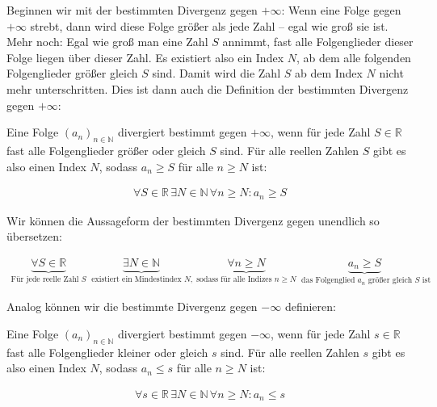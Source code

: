 \documentclass[fontsize=9pt,
               parskip=half-,
               DIV=14,
               listof=chapterentry,
               tocflat]{scrbook}
\begin{document}
Beginnen wir mit der bestimmten Divergenz gegen $+\infty $: Wenn eine Folge gegen $+\infty $ strebt, dann wird diese Folge größer als jede Zahl – egal wie groß sie ist. Mehr noch: Egal wie groß man eine Zahl $S$ annimmt, fast alle Folgenglieder dieser Folge liegen über dieser Zahl. Es existiert also ein Index $N$, ab dem alle folgenden Folgenglieder größer gleich $S$ sind. Damit wird die Zahl $S$ ab dem Index $N$ nicht mehr unterschritten. Dies ist dann auch die Definition der bestimmten Divergenz gegen $+\infty $:

\begin{definition*}
Eine Folge $(a_{n})_{n\in \mathbb {N} }$ divergiert bestimmt gegen $+\infty $, wenn für jede Zahl $S\in \mathbb {R} $ fast alle Folgenglieder größer oder gleich $S$ sind. Für alle reellen Zahlen $S$ gibt es also einen Index $N$, sodass $a_{n}\geq S$ für alle $n\geq N$ ist:

\begin{align*}
\forall S\in \mathbb {R} \,\exists N\in \mathbb {N} \,\forall n\geq N:a_{n}\geq S
\end{align*}

\end{definition*}

Wir können die Aussageform der bestimmten Divergenz gegen unendlich so übersetzen:

\begin{align*}
\underbrace {{\underset {}{}}\forall S\in \mathbb {R} } _{{\text{Für jede reelle Zahl }}S}\ \underbrace {{\underset {}{}}\exists N\in \mathbb {N} } _{{\text{ existiert ein Mindestindex }}N,}\ \underbrace {{\underset {}{}}\forall n\geq N} _{{\text{sodass für alle Indizes }}n\geq N}\ \underbrace {{\underset {}{}}a_{n}\geq S} _{{\text{ das Folgenglied }}a_{n}{\text{ größer gleich }}S{\text{ ist}}}
\end{align*}

Analog können wir die bestimmte Divergenz gegen $-\infty $ definieren:

\begin{definition*}
Eine Folge $(a_{n})_{n\in \mathbb {N} }$ divergiert bestimmt gegen $-\infty $, wenn für jede Zahl $s\in \mathbb {R} $ fast alle Folgenglieder kleiner oder gleich $s$ sind. Für alle reellen Zahlen $s$ gibt es also einen Index $N$, sodass $a_{n}\leq s$ für alle $n\geq N$ ist:

\begin{align*}
\forall s\in \mathbb {R} \,\exists N\in \mathbb {N} \,\forall n\geq N:a_{n}\leq s
\end{align*}

\end{definition*}
\end{document}
